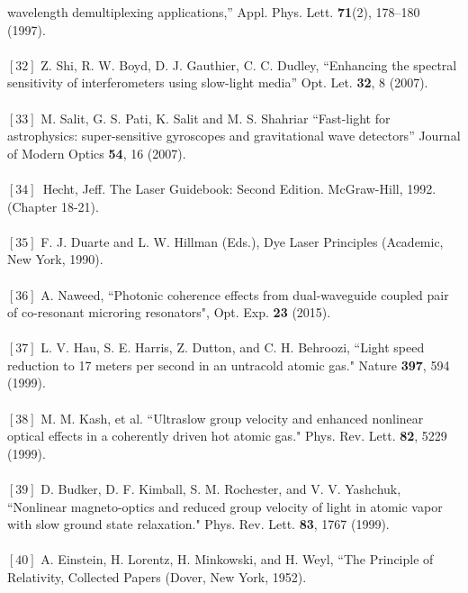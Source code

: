 {wavelength demultiplexing applications,” Appl. Phys. Lett. \textbf{71}(2), 178–180 (1997).\\
\\ $[32]$  Z. Shi, R. W. Boyd, D. J. Gauthier, C. C. Dudley, “Enhancing the spectral sensitivity of interferometers
using slow-light media” Opt. Let. \textbf{32}, 8 (2007).\\
\\ $[33]$  M. Salit, G. S. Pati, K. Salit and M. S. Shahriar “Fast-light for astrophysics: super-sensitive gyroscopes and gravitational wave detectors” Journal of Modern Optics \textbf{54}, 16 (2007).\\
\\ $[34]$\,  Hecht, Jeff. The Laser Guidebook: Second Edition. McGraw-Hill, 1992. (Chapter 18-21).\\
\\ $[35]$  F. J. Duarte and L. W. Hillman (Eds.), Dye Laser Principles (Academic, New York, 1990).\\
\\ $[36]$ A. Naweed, “Photonic coherence effects from dual-waveguide coupled pair of co-resonant microring resonators", Opt. Exp. \textbf{23} (2015).\\
\\ $[37]$ L. V. Hau, S. E. Harris, Z. Dutton, and C. H. Behroozi, “Light speed reduction to 17 meters per second in
an untracold atomic gas." Nature \textbf{397}, 594 (1999).\\
\\ $[38]$ M. M. Kash, et al. “Ultraslow group velocity and enhanced nonlinear optical effects in a coherently
driven hot atomic gas." Phys. Rev. Lett. \textbf{82}, 5229 (1999).\\
\\ $[39]$ D. Budker, D. F. Kimball, S. M. Rochester, and  V. V. Yashchuk, “Nonlinear magneto-optics and reduced
group velocity of light in atomic vapor with slow ground state relaxation." Phys. Rev. Lett. \textbf{83}, 1767 (1999).\\
\\ $[40]$  A. Einstein, H. Lorentz, H. Minkowski, and H. Weyl,  “The Principle of Relativity, Collected Papers
(Dover, New York, 1952).}


